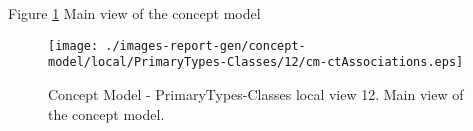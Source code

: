 Figure \ref{fig:lu.uni.lassy.excalibur.group09.spec-CM-view-local-PrimaryTypes-Classes-12} Main view of the concept model



\begin{figure}[htbp] 
\label{fig:lu.uni.lassy.excalibur.group09.spec-CM}
\begin{center}
\texttt{[image: ./images-report-gen/concept-model/local/PrimaryTypes-Classes/12/cm-ctAssociations.eps]}
\end{center}
\caption[Concept Model - PrimaryTypes-Classes local view 12 - Main view of the concept model]{Concept Model - PrimaryTypes-Classes local view 12. Main view of the concept model.}
\label{fig:lu.uni.lassy.excalibur.group09.spec-CM-view-local-PrimaryTypes-Classes-12}
\end{figure}
\vspace{0.5cm} 
